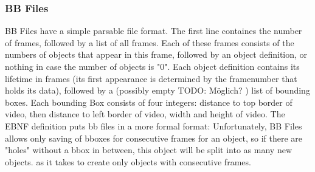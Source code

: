    \subsubsection{BB Files}
   BB Files have a simple parsable file format. The first line containes the number of frames, followed by a list of all frames. Each of these frames consists of the numbers of objects that appear in this frame, followed by an object definition, or nothing in case the number of objects is "0". Each object definition contains its lifetime in frames (its first appearance is determined by the framenumber that holds its data), followed by a (possibly empty TODO: Möglich? ) list of bounding boxes. Each bounding Box consists of four integers: distance to top border of video, then distance to left border of video, width and height of video. The EBNF definition puts bb files in a more formal format: 
Unfortunately, BB Files allows only saving of bboxes for consecutive frames for an object, so if there are "holes" without a bbox in between, this object will be split into as many new objects. as it takes to create only objects with consecutive frames.
